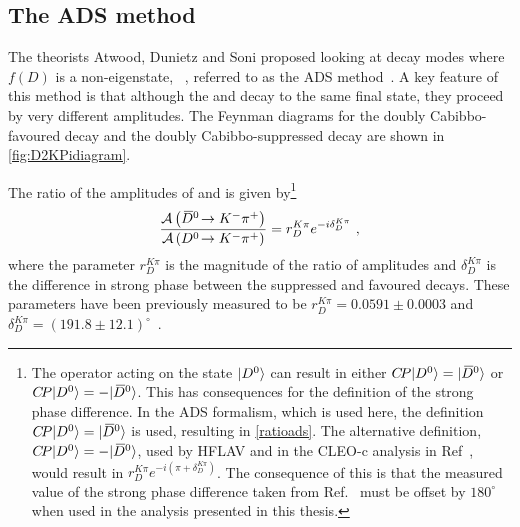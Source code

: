 \subsection{The ADS method}
\label{sec:theory:ads}

The theorists Atwood, Dunietz and Soni proposed looking at \D decay modes where $f(D)$ is a non-\CP eigenstate, \eg~\decay{\D}{\Km\pip}, referred to as the ADS method~\cite{ADS,ADS-2001}. A key feature of this method is that although the \Dz and \Dzb decay to the same final state, they proceed by very different amplitudes. The Feynman diagrams for the doubly Cabibbo-favoured \decay{\Dz}{\Km\pip} decay and the doubly Cabibbo-suppressed \decay{\Dz}{\Kp\pim} decay are shown in \fig\ref{fig:D2KPidiagram}.


The ratio of the amplitudes of \decay{\Dzb}{\Km\pip} and \decay{\Dz}{\Km\pip} is given by\footnote{The \CP operator acting on the state $|{{D}^0}\rangle$ can result in either ${C\!P}|{{D}^0}\rangle = |{{\kern 0.2em\overline{\kern -0.2em D}{}}{}^0}\rangle$ or ${C\!P}|{{D}^0}\rangle = - |{{\kern 0.2em\overline{\kern -0.2em D}{}}{}^0}\rangle$. This has consequences for the definition of the strong phase difference. In the ADS formalism, which is used here, the definition ${C\!P}|{{D}^0}\rangle = |{{\kern 0.2em\overline{\kern -0.2em D}{}}{}^0}\rangle$ is used, resulting in \eqn\ref{ratioads}. The alternative definition, ${C\!P}|{{D}^0}\rangle = - |{{\kern 0.2em\overline{\kern -0.2em D}{}}{}^0}\rangle$, used by HFLAV and in the CLEO-c analysis in Ref~\cite{charmkpi_deltab}, would result in $r_D^{K\pi}e^{-i(\pi + \delta_D^{K\pi})}$. The consequence of this is that the measured value of the strong phase difference taken from Ref.~\cite{charmkpi_deltab} must be offset by $180^{\circ}$ when used in the analysis presented in this thesis.}
\begin{equation}
\frac{\mathcal{A}\left({{\kern 0.2em\overline{\kern -0.2em D}{}}{}^0}\!\rightarrow {\ensuremath{{K}^-}}{\ensuremath{{\pi}^+}}\right)}{\mathcal{A}\left({{D}^0}\!\rightarrow {\ensuremath{{K}^-}}{\ensuremath{{\pi}^+}}\right)} = r_D^{K\pi}e^{-i\delta_D^{K\pi}} \text { ,}
\label{ratioads}
\end{equation}
where the parameter $r_D^{K\pi}$ is the magnitude of the ratio of amplitudes and $\delta_D^{K\pi}$ is the difference in strong phase between the suppressed and favoured decays. These parameters have been previously measured to be $r_D^{K\pi} = 0.0591 \pm 0.0003$ and $\delta_D^{K\pi} = \left(191.8 \pm 12.1\right)^{\circ}$~\cite{HFAG}.

